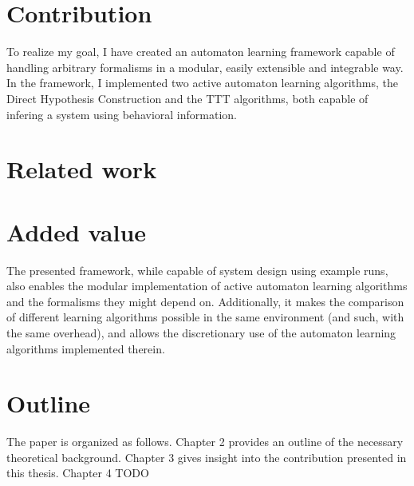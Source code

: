 \section{Contribution}

To realize my goal, I have created an automaton learning framework capable of handling arbitrary formalisms in a modular, easily extensible and integrable way. In the framework, I implemented two active automaton learning algorithms, the Direct Hypothesis Construction\cite{10.1007/978-3-642-34781-8_19} and the TTT\cite{10.1007/978-3-319-11164-3_26} algorithms, both capable of infering a system using behavioral information.

\section{Related work}



\section{Added value}

The presented framework, while capable of system design using example runs, also enables the modular implementation of active automaton learning algorithms and the formalisms they might depend on. Additionally, it makes the comparison of different learning algorithms possible in the same environment (and such, with the same overhead), and allows the discretionary use of the automaton learning algorithms implemented therein.
\section{Outline}

The paper is organized as follows. Chapter 2 provides an outline of the necessary theoretical background. Chapter 3 gives insight into the contribution presented in this thesis. Chapter 4 TODO
